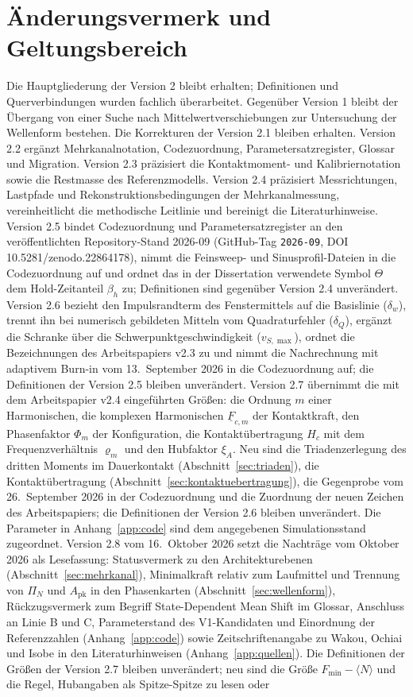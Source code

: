 \documentclass[11pt,a4paper]{article}
\begin{document}
\section*{Änderungsvermerk und Geltungsbereich}
Die Hauptgliederung der Version 2 bleibt erhalten; Definitionen und Querverbindungen wurden fachlich überarbeitet. Gegenüber Version 1 bleibt der Übergang von einer Suche nach Mittelwertverschiebungen zur Untersuchung der Wellenform bestehen. Die Korrekturen der Version 2.1 bleiben erhalten. Version 2.2 ergänzt Mehrkanalnotation, Codezuordnung, Parametersatzregister, Glossar und Migration. Version 2.3 präzisiert die Kontaktmoment- und Kalibriernotation sowie die Restmasse des Referenzmodells. Version 2.4 präzisiert Messrichtungen, Lastpfade und Rekonstruktionsbedingungen der Mehrkanalmessung, vereinheitlicht die methodische Leitlinie und bereinigt die Literaturhinweise. Version 2.5 bindet Codezuordnung und Parametersatzregister an den veröffentlichten Repository-Stand 2026-09 (GitHub-Tag \texttt{2026-09}, DOI 10.5281/\allowbreak\mbox{zenodo.22864178}), nimmt die Feinsweep- und Sinusprofil-Dateien in die Codezuordnung auf und ordnet das in der Dissertation verwendete Symbol $\Theta$ dem Hold-Zeitanteil $\beta_h$ zu; Definitionen sind gegenüber Version 2.4 unverändert. Version 2.6 bezieht den Impulsrandterm des Fenstermittels auf die Basislinie ($\delta_w$), trennt ihn bei numerisch gebildeten Mitteln vom Quadraturfehler ($\delta_Q$), ergänzt die Schranke über die Schwerpunktgeschwindigkeit ($v_{S,\max}$), ordnet die Bezeichnungen des Arbeitspapiers v2.3 zu und nimmt die Nachrechnung mit adaptivem Burn-in vom 13.~September 2026 in die Codezuordnung auf; die Definitionen der Version 2.5 bleiben unverändert. Version 2.7 übernimmt die mit dem Arbeitspapier v2.4 eingeführten Größen: die Ordnung $m$ einer Harmonischen, die komplexen Harmonischen $\underline{F}_{c,m}$ der Kontaktkraft, den Phasenfaktor $\Phi_m$ der Konfiguration, die Kontaktübertragung $H_c$ mit dem Frequenzverhältnis $\varrho_m$ und den Hubfaktor $\xi_A$. Neu sind die Triadenzerlegung des dritten Moments im Dauerkontakt (Abschnitt~\ref{sec:triaden}), die Kontaktübertragung (Abschnitt~\ref{sec:kontaktuebertragung}), die Gegenprobe vom 26.~September 2026 in der Codezuordnung und die Zuordnung der neuen Zeichen des Arbeitspapiers; die Definitionen der Version 2.6 bleiben unverändert. Die Parameter in Anhang~\ref{app:code} sind dem angegebenen Simulationsstand zugeordnet. Version 2.8 vom 16.~Oktober 2026 setzt die Nachträge vom Oktober 2026 als Lesefassung: Statusvermerk zu den Architekturebenen (Abschnitt~\ref{sec:mehrkanal}), Minimalkraft relativ zum Laufmittel und Trennung von $\Pi_N$ und $A_{\mathrm{pk}}$ in den Phasenkarten (Abschnitt~\ref{sec:wellenform}), Rückzugsvermerk zum Begriff State-Dependent Mean Shift im Glossar, Anschluss an Linie B und C, Parameterstand des V1-Kandidaten und Einordnung der Referenzzahlen (Anhang~\ref{app:code}) sowie Zeitschriftenangabe zu Wakou, Ochiai und Isobe in den Literaturhinweisen (Anhang~\ref{app:quellen}). Die Definitionen der Größen der Version 2.7 bleiben unverändert; neu sind die Größe $F_{\min}-\langle N\rangle$ und die Regel, Hubangaben als Spitze-Spitze zu lesen oder 
\end{document}
